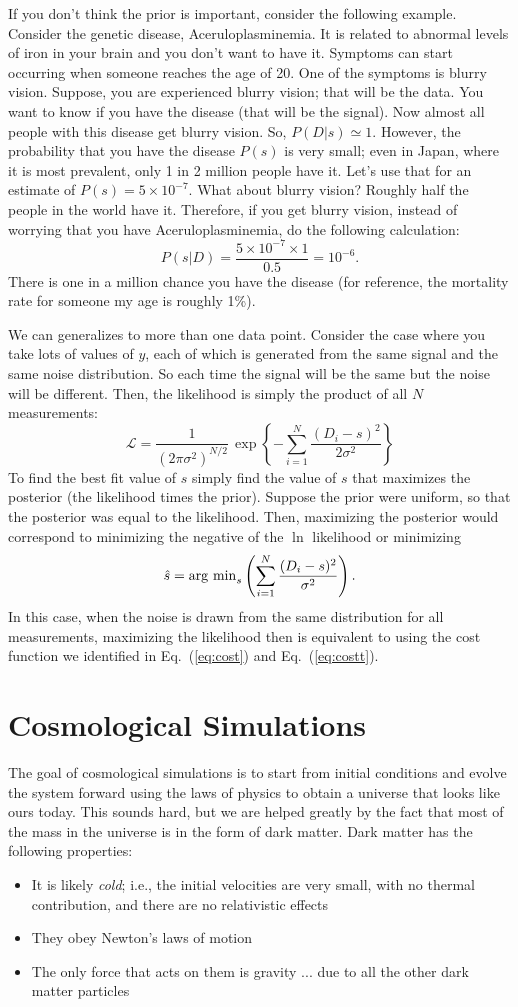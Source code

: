 \documentclass[prd,amsmath,aps,floats,amssymb, floatfix,
  superscriptaddress,nofootinbib]{revtex4-1}
\newcommand{\ec}[1]{Eq.~(\ref{eq:#1})}
\numberwithin{equation}{section}
\newcommand\be{\begin{equation}}
\newcommand\ee{\end{equation}}
\newcommand\bei{\begin{itemize}}
\newcommand\eei{\end{itemize}}
\begin{document}
If you don't think the prior is important, consider the following example. Consider the genetic disease, Aceruloplasminemia. It is related to abnormal levels of iron in your brain and you don't want to have it. Symptoms can start occurring when someone reaches the age of 20. One of the symptoms is blurry vision. Suppose, you are experienced blurry vision; that will be the data. You want to know if you have the disease (that will be the signal). Now almost all people with this disease get blurry vision. So, $P(D|s) \simeq 1$. However, the probability that you have the disease $P(s)$ is very small; even in Japan, where it is most prevalent, only 1 in 2 million people have it. Let's use that for an estimate of $P(s)=5\times 10^{-7}$. What about blurry vision? Roughly half the people in the world have it. Therefore, if you get blurry vision, instead of worrying that you have Aceruloplasminemia, do the following calculation:
 \be
 P(s|D) = \frac{5\times 10^{-7} \times 1}{0.5} = 10^{-6}.\ee
 There is one in a million chance you have the disease (for reference, the mortality rate for someone my age is roughly 1\%).
 
 We can generalizes to more than one data point. Consider the case where you take lots of values of $y$, each of which is generated from the same signal and the same noise distribution. So each time the signal will be the same but the noise will be different. Then, the likelihood is simply the product of all $N$ measurements:
 \be
 \mathcal{L} = \frac{1}{(2\pi\sigma^2)^{N/2}}\, \exp\left\{ - \sum_{i=1}^N \frac{(D_i-s)^2}{2\sigma^2} \right\} 
 \ee
To find the best fit value of $s$ simply find the value of $s$ that maximizes the posterior (the likelihood times the prior). Suppose the prior were uniform, so that the posterior was equal to the likelihood. Then, maximizing the posterior would correspond to minimizing the negative of the $\ln$ likelihood or minimizing
\be
\hat s = {\rm arg\ min}_s \left( \sum_{i=1}^N \frac{(D_i-s)^2}{\sigma^2}  \right)
.\ee
In this case, when the noise is drawn from the same distribution for all measurements, maximizing the likelihood then is equivalent to using the cost function we identified in \ec{cost} and \ec{costt}.


\section{Cosmological Simulations}

The goal of cosmological simulations is to start from initial conditions and evolve the system forward using the laws of physics to obtain a universe that looks like ours today. This sounds hard, but we are helped greatly by the fact that most of the mass in the universe is in the form of dark matter. Dark matter has the following properties:
\bei
\item It is likely {\it cold}; i.e., the initial velocities are very small, with no thermal contribution, and there are no relativistic effects
\item They obey Newton's laws of motion
\item The only force that acts on them is gravity ... due to all the other dark matter particles
\eei
\end{document}
